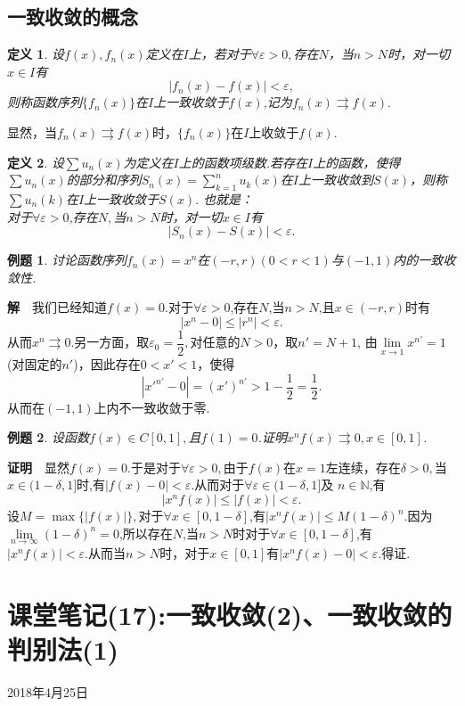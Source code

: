\documentclass[UTF8]{article}
\newcommand{\zm}{\textbf{证明}$\quad$}
\newcommand{\jie}{\textbf{解}$\quad$}
\newtheorem{dfn}{\hspace{2em}定义}[section]
\newtheorem{exa}{\hspace{2em}例题}[section]
\begin{document}
\subsection{一致收敛的概念}
\begin{dfn}
  设$f(x),f_n(x)$定义在$I$上，若对于$\forall\varepsilon>0,$存在$N$，当$n>N$时，对一切$x\in I$有
  $$|f_n(x)-f(x)|<\varepsilon,$$
  则称函数序列$\{f_n(x)\}$在$I$上一致收敛于$f(x)$,记为$f_n(x)\rightrightarrows f(x).$
\end{dfn}
显然，当$f_n(x)\rightrightarrows f(x)$时，$\{f_n(x)\}$在$I$上收敛于$f(x)$.
\begin{dfn}
  设$\sum u_n(x)$为定义在$I$上的函数项级数.若存在$I$上的函数，使得$\sum u_n(x)$的部分和序列$S_n(x)
  =\sum\limits_{k=1}^nu_k(x)$在$I$上一致收敛到$S(x)$，则称$\sum u_n(k)$在$I$上一致收敛于$S(x).$
  也就是：\\
  对于$\forall \varepsilon>0$,存在$N,$当$n>N$时，对一切$x\in I$有
  $$|S_n(x)-S(x)|<\varepsilon.$$
\end{dfn}
\begin{exa}
  讨论函数序列$f_n(x)=x^n$在$(-r,r)(0<r<1)$与$(-1,1)$内的一致收敛性.
\end{exa}
\jie 我们已经知道$f(x)=0$.对于$\forall\varepsilon>0$,存在$N$,当$n>N$,且$x\in(-r,r)$时有
$$|x^n-0|\le|r^n|<\varepsilon.$$
从而$x^n\rightrightarrows0.$另一方面，取$\varepsilon_0=\dfrac{1}{2},$对任意的$N>0$，取$n'=N+1$,
由$\lim\limits_{x\to1}x^{n'}=1$(对固定的$n'$)，因此存在$0<x'<1$，使得
$$|x'^{n'}-0|=(x')^{n'}>1-\dfrac{1}{2}=\dfrac{1}{2}.$$从而在$(-1,1)$上内不一致收敛于零.
\begin{exa}
  设函数$f(x)\in C[0,1],$且$f(1)=0$.证明$x^nf(x)\rightrightarrows 0,x\in[0,1]$.
\end{exa}
\zm 显然$f(x)=0$.于是对于$\forall\varepsilon>0,$由于$f(x)$在$x=1$左连续，存在$\delta>0,$当
$x\in(1-\delta,1]$时,有$|f(x)-0|<\varepsilon.$从而对于$\forall\varepsilon\in(1-\delta,1]$及
$n\in\mathbb{N}$,有
$$|x^nf(x)|\le|f(x)|<\varepsilon.$$
设$M=\max\{|f(x)|\},$对于$\forall x\in[0,1-\delta]$,有$|x^nf(x)|\le M(1-\delta)^n.$因为
$\lim\limits_{n\to\infty}(1-\delta)^n=0$,所以存在$N$,当$n>N$时对于$\forall x\in[0,1-\delta]$,有
$|x^nf(x)|<\varepsilon.$从而当$n>N$时，对于$x\in[0,1]$有$|x^nf(x)-0|<\varepsilon.$得证.
\clearpage
\section{课堂笔记(17):一致收敛(2)、一致收敛的判别法(1)}
\begin{center}
  2018年4月25日
\end{center}
\end{document}
